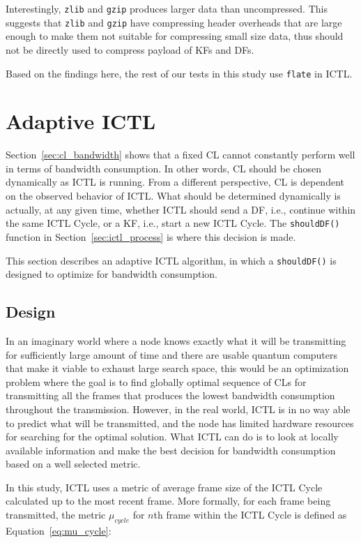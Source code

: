 \documentclass[12pt]{report}
\begin{document}
Interestingly, \texttt{zlib} and \texttt{gzip} produces larger data than uncompressed. This suggests that \texttt{zlib} and \texttt{gzip} have compressing header overheads that are large enough to make them not suitable for compressing small size data, thus should not be directly used to compress payload of KFs and DFs.

Based on the findings here, the rest of our tests in this study use \texttt{flate} in ICTL.

\section{Adaptive ICTL}
\label{sec:adaptive_ictl}

Section~\ref{sec:cl_bandwidth} shows that a fixed CL cannot constantly perform well in terms of bandwidth consumption. In other words, CL should be chosen dynamically as ICTL is running. From a different perspective, CL is dependent on the observed behavior of ICTL. What should be determined dynamically is actually, at any given time, whether ICTL should send a DF, i.e., continue within the same ICTL Cycle, or a KF, i.e., start a new ICTL Cycle. The \texttt{shouldDF()} function in Section~\ref{sec:ictl_process} is where this decision is made.

This section describes an adaptive ICTL algorithm, in which a \texttt{shouldDF()} is designed to optimize for bandwidth consumption.

\subsection{Design}

In an imaginary world where a node knows exactly what it will be transmitting for sufficiently large amount of time and there are usable quantum computers that make it viable to exhaust large search space, this would be an optimization problem where the goal is to find globally optimal sequence of CLs for transmitting all the frames that produces the lowest bandwidth consumption throughout the transmission. However, in the real world, ICTL is in no way able to predict what will be transmitted, and the node has limited hardware resources for searching for the optimal solution. What ICTL can do is to look at locally available information and make the best decision for bandwidth consumption based on a well selected metric. 

In this study, ICTL uses a metric of average frame size of the ICTL Cycle calculated up to the most recent frame. More formally, for each frame being transmitted, the metric $\mu_{cycle}$ for $n$th frame within the ICTL Cycle is defined as Equation~\ref{eq:mu_cycle}:
\end{document}
